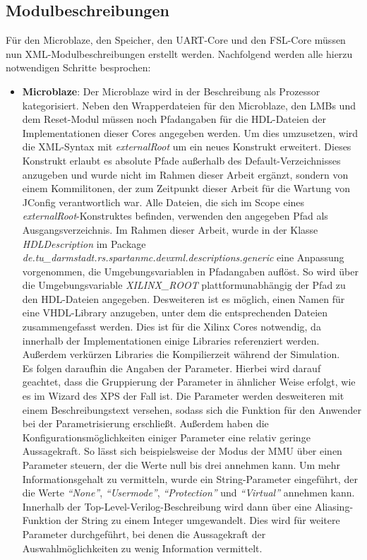 \subsection{Modulbeschreibungen} \label{subsec:Moduldesc}
Für den Microblaze, den Speicher, den UART-Core und den FSL-Core müssen nun XML-Modulbeschreibungen erstellt werden. Nachfolgend werden alle hierzu notwendigen Schritte besprochen:
\begin{itemize}
\item \textbf{Microblaze}: Der Microblaze wird in der Beschreibung als Prozessor kategorisiert. Neben den Wrapperdateien für den Microblaze, den LMBs und dem Reset-Modul müssen noch Pfadangaben für die HDL-Dateien der Implementationen dieser Cores angegeben werden. Um dies umzusetzen, wird die XML-Syntax mit \textit{externalRoot} um ein neues Konstrukt erweitert. Dieses Konstrukt erlaubt es absolute Pfade außerhalb des Default-Verzeichnisses anzugeben und wurde nicht im Rahmen dieser Arbeit ergänzt, sondern von einem Kommilitonen, der zum Zeitpunkt dieser Arbeit für die Wartung von JConfig verantwortlich war. Alle Dateien, die sich im Scope eines \textit{externalRoot}-Konstruktes befinden, verwenden den angegeben Pfad als Ausgangsverzeichnis. Im Rahmen dieser Arbeit, wurde in der Klasse \textit{HDLDescription} im Package \textit{de.tu\_darmstadt.rs.spartanmc.devxml.descriptions.generic} eine Anpassung vorgenommen, die Umgebungsvariablen in Pfadangaben auflöst. So wird über die Umgebungsvariable \textit{XILINX\_ROOT} plattformunabhängig der Pfad zu den HDL-Dateien angegeben. Desweiteren ist es möglich, einen Namen für eine VHDL-Library anzugeben, unter dem die entsprechenden Dateien zusammengefasst werden. Dies ist für die Xilinx Cores notwendig, da innerhalb der Implementationen einige Libraries referenziert werden. Außerdem verkürzen Libraries die Kompilierzeit während der Simulation.\\
Es folgen daraufhin die Angaben der Parameter. Hierbei wird darauf geachtet, dass die Gruppierung der Parameter in ähnlicher Weise erfolgt, wie es im Wizard des XPS der Fall ist. Die Parameter werden desweiteren mit einem Beschreibungstext versehen, sodass sich die Funktion für den Anwender bei der Parametrisierung erschließt. Außerdem haben die Konfigurationsmöglichkeiten einiger Parameter eine relativ geringe Aussagekraft. So lässt sich beispielsweise der Modus der MMU über einen Parameter steuern, der die Werte null bis drei annehmen kann. Um mehr Informationsgehalt zu vermitteln, wurde ein String-Parameter eingeführt, der die Werte \textit{``None''}, \textit{``Usermode''}, \textit{``Protection''} und \textit{``Virtual''} annehmen kann. Innerhalb der Top-Level-Verilog-Beschreibung wird dann über eine Aliasing-Funktion der String zu einem Integer umgewandelt. Dies wird für weitere Parameter durchgeführt, bei denen die Aussagekraft der Auswahlmöglichkeiten zu wenig Information vermittelt.\\

\end{itemize}
